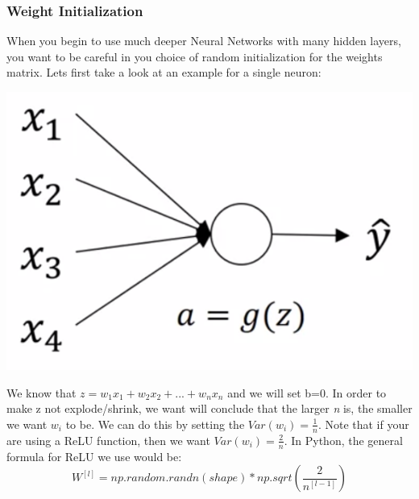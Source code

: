 \documentclass[11pt, a4paper]{article}
\begin{document}
\begin{spacing}{1.1}
	\subsubsection{Weight Initialization}
	When you begin to use much deeper Neural Networks with many hidden layers, you want to be careful in you choice of random initialization for the weights matrix. Lets first take a look at an example for a single neuron:
	\begin{center} \includegraphics[scale=.4]{single_neuron} \\ \end{center} 
	We know that $z = w_1x_1 + w_2x_2 + ... + w_nx_n$ and we will set b=0. In order to make z not explode/shrink, we want will conclude that the larger \textit{n} is, the smaller we want $w_i$ to be. We can do this by setting the $Var(w_i) = \frac{1}{n}$. Note that if your are using a ReLU function, then we want $Var(w_i) = \frac{2}{n}$. In Python, the general formula for ReLU we use would be: $$ W^{[l]} = np.random.randn(shape) * np.sqrt(\frac{2}{n^{[l-1]}})$$ \newpage


\end{spacing}
\end{document}
